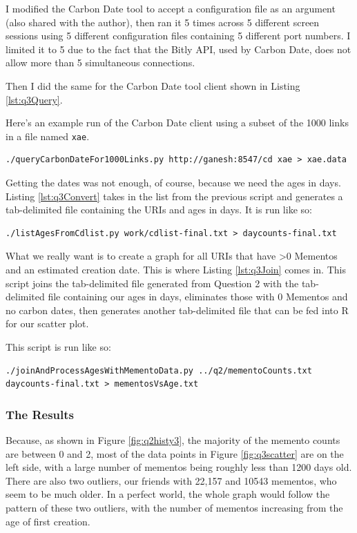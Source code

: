 \documentclass[letterpaper,11pt]{article}
\begin{document}
I modified the Carbon Date tool to accept a configuration file as an argument (also shared with the author), then ran it 5 times across 5 different screen sessions using 5 different configuration files containing 5 different port numbers.  I limited it to 5 due to the fact that the Bitly API, used by Carbon Date, does not allow more than 5 simultaneous connections\cite{bitly}.

Then I did the same for the Carbon Date tool client shown in Listing \ref{lst:q3Query}.

Here's an example run of the Carbon Date client using a subset of the 1000 links in a file named \verb+xae+.
\begin{lstlisting}[frame=single]
./queryCarbonDateFor1000Links.py http://ganesh:8547/cd xae > xae.data
\end{lstlisting}

Getting the dates was not enough, of course, because we need the ages in days.  Listing \ref{lst:q3Convert} takes in the list from the previous script and generates a tab-delimited file containing the URIs and ages in days.  It is run like so:
\begin{lstlisting}[frame=single]
./listAgesFromCdlist.py work/cdlist-final.txt > daycounts-final.txt
\end{lstlisting}

What we really want is to create a graph for all URIs that have \textgreater 0 Mementos and an estimated creation date.  This is where Listing \ref{lst:q3Join} comes in.  This script joins the tab-delimited file generated from Question 2 with the tab-delimited file containing our ages in days, eliminates those with 0 Mementos and no carbon dates, then generates another tab-delimited file that can be fed into R for our scatter plot.

This script is run like so:
\begin{lstlisting}[frame=single]
./joinAndProcessAgesWithMementoData.py ../q2/mementoCounts.txt daycounts-final.txt > mementosVsAge.txt
\end{lstlisting}

\subsubsection*{The Results}

Because, as shown in Figure \ref{fig:q2histy3}, the majority of the memento counts are between 0 and 2, most of the data points in Figure \ref{fig:q3scatter} are on the left side, with a large number of mementos being roughly less than 1200 days old.  There are also two outliers, our friends with 22,157 and 10543 mementos, who seem to be much older.  In a perfect world, the whole graph would follow the pattern of these two outliers, with the number of mementos increasing from the age of first creation.
\end{document}
